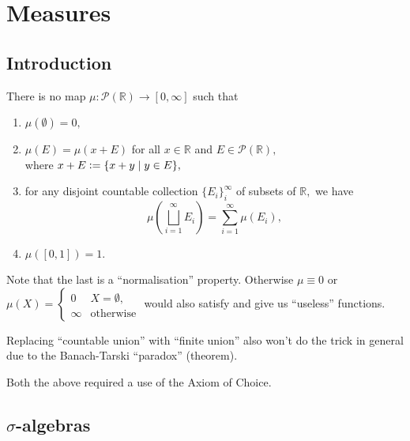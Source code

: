 \documentclass[12pt]{article}	%
\begin{document}
\coverpage

\updated{\today}

\thispagestyle{empty}
\tableofcontents
\newpage
\pagestyle{fancy}
\setcounter{page}{1}

\section{Measures} %

\subsection{Introduction}

\begin{thm}
	There is no map $\mu : \mathcal{P}(\mathbb{R}) \to [0, \infty]$ such that
	\begin{enumerate}
		\item $\mu(\emptyset) = 0,$
		\item $\mu(E) = \mu(x + E)$ for all $x \in \mathbb{R}$ and $E \in \mathcal{P}(\mathbb{R}),$\\
		where $x + E \vcentcolon= \{x + y \mid y \in E\},$
		\item for any disjoint countable collection $\{E_i\}_{i}^{\infty}$ of subsets of $\mathbb{R},$ we have
		\begin{equation*} 
			\mu\left(\bigsqcup_{i = 1}^\infty E_i\right) = \sum_{i = 1}^{\infty} \mu(E_i),
		\end{equation*}
		\item $\mu([0, 1]) = 1.$
	\end{enumerate}
\end{thm}
Note that the last is a ``normalisation'' property. Otherwise $\mu \equiv 0$ or $\mu(X) = \begin{cases}
	0 & X = \emptyset,\\
	\infty & \text{otherwise}
\end{cases}$ would also satisfy and give us ``useless'' functions.

Replacing ``countable union'' with ``finite union'' also won't do the trick in general due to the Banach-Tarski ``paradox'' (theorem).

Both the above required a use of the Axiom of Choice.

\subsection{\texorpdfstring{$\sigma$}{s}-algebras}
\end{document}
